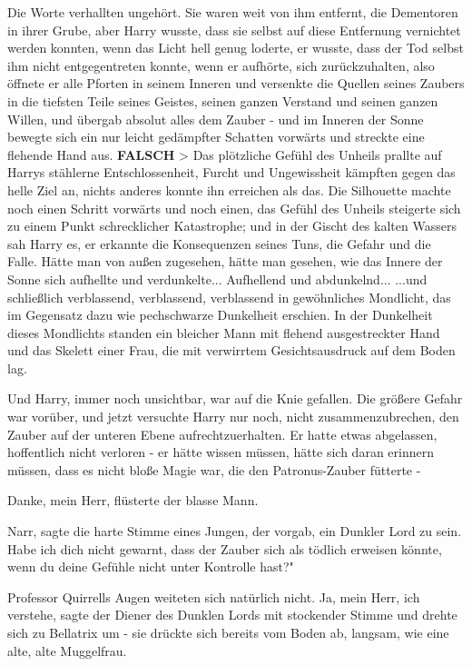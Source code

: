 Die Worte verhallten ungehört. Sie waren weit von ihm entfernt, die Dementoren
in ihrer Grube, aber Harry wusste, dass sie selbst auf diese Entfernung
vernichtet werden konnten, wenn das Licht hell genug loderte, er wusste, dass
der Tod selbst ihm nicht entgegentreten konnte, wenn er aufhörte, sich
zurückzuhalten, also öffnete er alle Pforten in seinem Inneren und versenkte die
Quellen seines Zaubers in die tiefsten Teile seines Geistes, seinen ganzen
Verstand und seinen ganzen Willen, und übergab absolut alles dem Zauber - und im
Inneren der Sonne bewegte sich ein nur leicht gedämpfter Schatten vorwärts und
streckte eine flehende Hand aus.
\textbf{FALSCH}    > Das plötzliche
Gefühl des Unheils prallte auf Harrys stählerne Entschlossenheit, Furcht und
Ungewissheit kämpften gegen das helle Ziel an, nichts anderes konnte ihn
erreichen als das. Die Silhouette machte noch einen Schritt vorwärts und noch
einen, das Gefühl des Unheils steigerte sich zu einem Punkt schrecklicher
Katastrophe; und in der Gischt des kalten Wassers sah Harry es, er erkannte die
Konsequenzen seines Tuns, die Gefahr und die Falle. Hätte man von außen
zugesehen, hätte man gesehen, wie das Innere der Sonne sich aufhellte und
verdunkelte... Aufhellend und abdunkelnd... ...und schließlich verblassend,
verblassend, verblassend in gewöhnliches Mondlicht, das im Gegensatz dazu wie
pechschwarze Dunkelheit erschien. In der Dunkelheit dieses Mondlichts standen
ein bleicher Mann mit flehend ausgestreckter Hand und das Skelett einer Frau,
die mit verwirrtem Gesichtsausdruck auf dem Boden lag.

Und Harry, immer noch unsichtbar, war auf die Knie gefallen. Die größere Gefahr
war vorüber, und jetzt versuchte Harry nur noch, nicht zusammenzubrechen, den
Zauber auf der unteren Ebene aufrechtzuerhalten. Er hatte etwas abgelassen,
hoffentlich nicht verloren - er hätte wissen müssen, hätte sich daran erinnern
müssen, dass es nicht bloße Magie war, die den Patronus-Zauber fütterte -

\glqq{}Danke, mein Herr\grqq{}, flüsterte der blasse Mann.

\glqq{}Narr\grqq{}, sagte die harte Stimme eines Jungen, der vorgab, ein Dunkler
Lord zu sein. \glqq{}Habe ich dich nicht gewarnt, dass der Zauber sich als
tödlich erweisen könnte, wenn du deine Gefühle nicht unter Kontrolle hast?"

Professor Quirrells Augen weiteten sich natürlich nicht. \glqq{}Ja, mein Herr,
ich verstehe\grqq{}, sagte der Diener des Dunklen Lords mit stockender Stimme
und drehte sich zu Bellatrix um - sie drückte sich bereits vom Boden ab,
langsam, wie eine alte, alte Muggelfrau.

